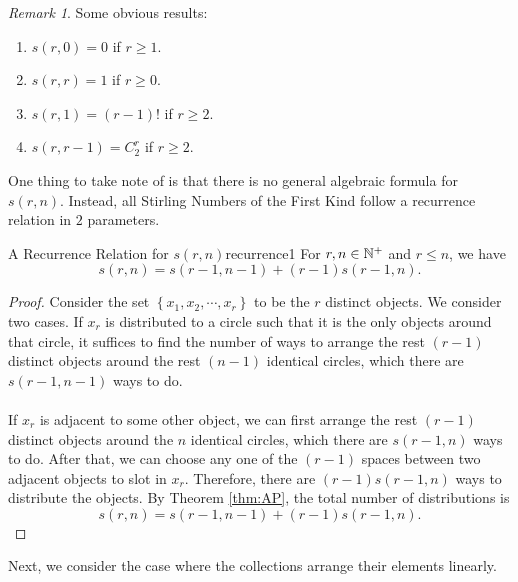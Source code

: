 \documentclass[math]{amznotes}
\theoremstyle{remark}
\newtheorem*{remark}{Remark}
\newcommand{\0}{\mathbf{0}}
\newcommand{\1}{\mathbf{1}}
\begin{document}
\begin{notebox}
    \begin{remark}
        Some obvious results:
        \begin{enumerate}
            \item $s(r, 0) = 0$ if $r \geq 1$.
            \item $s(r, r) = 1$ if $r \geq 0$.
            \item $s(r, 1) = (r - 1)!$ if $r \geq 2$.
            \item $s(r, r - 1) = C^r_2$ if $r \geq 2$.
        \end{enumerate}
    \end{remark}
\end{notebox}
One thing to take note of is that there is no general algebraic formula for $s(r, n)$. Instead, all Stirling Numbers of the First Kind follow a recurrence relation in $2$ parameters.
\begin{thmbox}{A Recurrence Relation for $s(r, n)$}{recurrence1}
    For $r, n \in \mathbb{N}^+$ and $r \leq n$, we have
    \begin{equation*}
        s(r, n) = s(r - 1, n - 1) + (r - 1)s(r - 1, n).
    \end{equation*}
    \tcblower   
    \begin{proof}
        Consider the set $\left\{x_1, x_2, \cdots, x_r\right\}$ to be the $r$ distinct objects. We consider two cases. If $x_r$ is distributed to a circle such that it is the only objects around that circle, it suffices to find the number of ways to arrange the rest $(r - 1)$ distinct objects around the rest $(n - 1)$ identical circles, which there are $s(r - 1, n - 1)$ ways to do.
        \\\\
        If $x_r$ is adjacent to some other object, we can first arrange the rest $(r - 1)$ distinct objects around the $n$ identical circles, which there are $s(r - 1, n)$ ways to do. After that, we can choose any one of the $(r - 1)$ spaces between two adjacent objects to slot in $x_r$. Therefore, there are $(r - 1)s(r - 1, n)$ ways to distribute the objects. By Theorem \ref{thm:AP}, the total number of distributions is 
        \begin{equation*}
            s(r, n) = s(r - 1, n - 1) + (r - 1)s(r - 1, n).
        \end{equation*}
    \end{proof}
\end{thmbox}
Next, we consider the case where the collections arrange their elements linearly.
\end{document}

